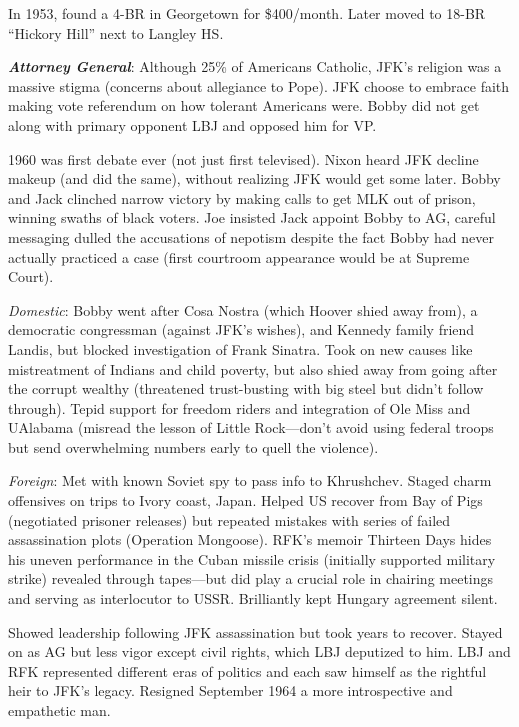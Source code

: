 \documentclass[
]{article}
\begin{document}
In 1953, found a 4-BR in Georgetown for \$400/month. Later moved to
18-BR ``Hickory Hill'' next to Langley HS.

\textbf{\emph{Attorney General}}: Although 25\% of Americans Catholic,
JFK's religion was a massive stigma (concerns about allegiance to Pope).
JFK choose to embrace faith making vote referendum on how tolerant
Americans were. Bobby did not get along with primary opponent LBJ and
opposed him for VP.

1960 was first debate ever (not just first televised). Nixon heard JFK
decline makeup (and did the same), without realizing JFK would get some
later. Bobby and Jack clinched narrow victory by making calls to get MLK
out of prison, winning swaths of black voters. Joe insisted Jack appoint
Bobby to AG, careful messaging dulled the accusations of nepotism
despite the fact Bobby had never actually practiced a case (first
courtroom appearance would be at Supreme Court).

\emph{Domestic}: Bobby went after Cosa Nostra (which Hoover shied away
from), a democratic congressman (against JFK's wishes), and Kennedy
family friend Landis, but blocked investigation of Frank Sinatra. Took
on new causes like mistreatment of Indians and child poverty, but also
shied away from going after the corrupt wealthy (threatened
trust-busting with big steel but didn't follow through). Tepid support
for freedom riders and integration of Ole Miss and UAlabama (misread the
lesson of Little Rock---don't avoid using federal troops but send
overwhelming numbers early to quell the violence).

\emph{Foreign}: Met with known Soviet spy to pass info to Khrushchev.
Staged charm offensives on trips to Ivory coast, Japan. Helped US
recover from Bay of Pigs (negotiated prisoner releases) but repeated
mistakes with series of failed assassination plots (Operation Mongoose).
RFK's memoir Thirteen Days hides his uneven performance in the Cuban
missile crisis (initially supported military strike) revealed through
tapes---but did play a crucial role in chairing meetings and serving as
interlocutor to USSR. Brilliantly kept Hungary agreement silent.

Showed leadership following JFK assassination but took years to recover.
Stayed on as AG but less vigor except civil rights, which LBJ deputized
to him. LBJ and RFK represented different eras of politics and each saw
himself as the rightful heir to JFK's legacy. Resigned September 1964 a
more introspective and empathetic man.
\end{document}
